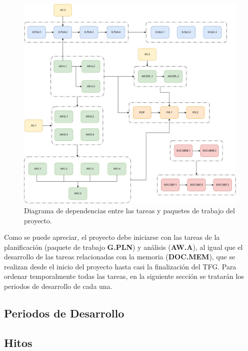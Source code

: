 \begin{figure}[H]
    \centering
    \includegraphics[width=\textwidth]{figures/dependencias_tareas.png}
    \caption{Diagrama de dependencias entre las tareas y paquetes de trabajo del proyecto.}
    \label{fig:dependencias_tareas}
\end{figure}

Como se puede apreciar, el proyecto debe iniciarse con las tareas de la planificación (paquete de trabajo \textbf{G.PLN}) y análisis (\textbf{AW.A}), al igual que el desarrollo de las tareas relacionadas con la memoria (\textbf{DOC.MEM}), que se realizan desde el inicio del proyecto hasta casi la finalización del TFG. Para ordenar temporalmente todas las tareas, en la siguiente sección se tratarán los periodos de desarrollo de cada una.

\subsection{Periodos de Desarrollo}






\subsection{Hitos}







